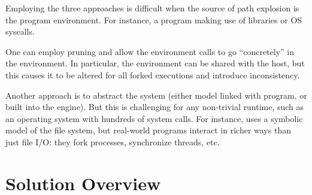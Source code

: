 

Employing the three approaches is difficult when the source of path explosion is the program environment.  For instance, a program making use of libraries or OS syscalls.

One can employ pruning and allow the environment calls to go ``concretely'' in the environment.  In particular, the environment can be shared with the host, but this causes it to be altered for all forked executions and introduce inconsistency.

Another approach is to abstract the system (either model linked with program, or built into the engine).  But this is challenging for any non-trivial runtime, such as an operating system with hundreds of system calls.  For instance, \klee uses a symbolic model of the file system, but real-world programs interact in richer ways than just file I/O: they fork processes, synchronize threads, etc.


\section{Solution Overview}

